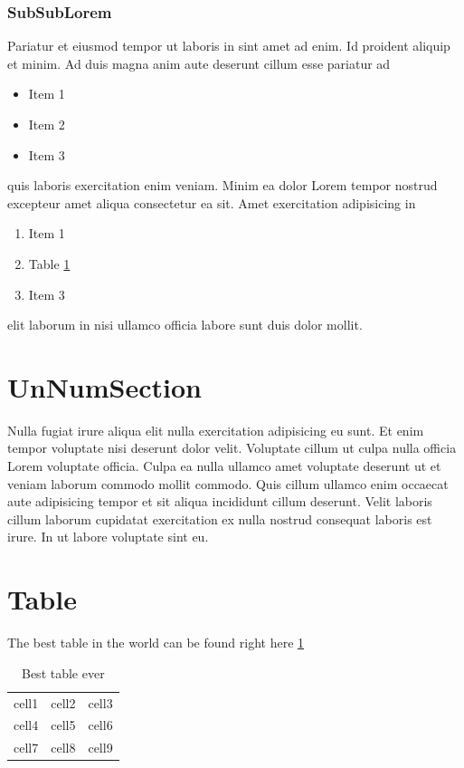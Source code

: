 \documentclass[a4paper]{article}
\begin{document}
    \subsubsection{SubSubLorem}
    Pariatur et eiusmod tempor ut laboris in sint amet ad enim. Id proident 
    aliquip et minim. Ad duis magna anim aute deserunt cillum esse pariatur ad 
    
    \begin{itemize}
        \item Item 1
        \item Item 2
        \item Item 3
    \end{itemize}

    
    quis laboris exercitation enim veniam. Minim ea dolor Lorem tempor nostrud 
    excepteur amet aliqua consectetur ea sit. Amet exercitation adipisicing in 

    \begin{enumerate}
        \item Item 1
        \item Table \ref{tab:tableTest}
        \item Item 3
    \end{enumerate}
    elit laborum in nisi ullamco officia labore sunt duis dolor mollit.

    \section*{UnNumSection}
    Nulla fugiat irure aliqua elit nulla exercitation adipisicing eu sunt. Et enim tempor voluptate nisi deserunt dolor velit. Voluptate cillum ut culpa nulla officia Lorem voluptate officia. Culpa ea nulla ullamco amet voluptate deserunt ut et veniam laborum commodo mollit commodo. Quis cillum ullamco enim occaecat aute adipisicing tempor et sit aliqua incididunt cillum deserunt. Velit laboris cillum laborum cupidatat exercitation ex nulla nostrud consequat laboris est irure. In ut labore voluptate sint eu.
    

    \section{Table}
    The best table in the world can be found right here \ref{tab:tableTest}
        \begin{table}
            \begin{center}
                \begin{tabular}{ |c|c|c| }
                    \hline
                    cell1 & cell2 & cell3 \\ 
                    cell4 & cell5 & cell6 \\  
                    cell7 & cell8 & cell9 \\    
                    \hline
                \end{tabular}
            \end{center}
            \caption{\label{tab:tableTest}Best table ever}
        \end{table}
\end{document}
